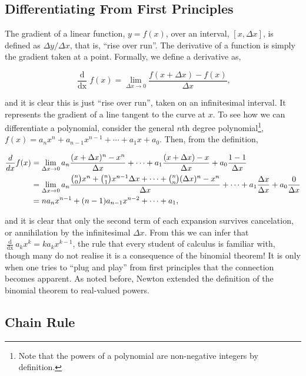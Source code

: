 \documentclass[11pt]{amsart}
\begin{document}
\subsection{Differentiating From First Principles}

The gradient of a linear function, $y = f(x)$, over an interval, $[x, \Delta x]$, is defined as $\Delta y / \Delta x$, that is, ``rise over run''. The derivative of a function is simply the gradient taken at a point. Formally, we define a derivative as,

$$\frac{\mathop{d}}{\mathop{dx}} f(x) = \lim_{\Delta x \to 0} \frac{f(x  + \Delta x) - f(x)}{\Delta x},$$

and it is clear this is just ``rise over run'', taken on an infinitesimal interval. It represents the gradient of a line tangent to the curve at $x$. To see how we can differentiate a polynomial, consider the general $n$th degree polynomial\footnote{Note that the powers of a polynomial are non-negative integers by definition.}, $f(x) = a_nx^n + a_{n-1}x^{n-1} + \cdots + a_1x + a_0$. Then, from the definition,

\begin{align}
\frac{\mathop{d}}{\mathop{dx}} f(x) &= \lim_{\Delta x \to 0} a_n\frac{(x + \Delta x)^n - x^n}{\Delta x} + \cdots + a_1\frac{(x + \Delta x) - x}{\Delta x} + a_0\frac{1 - 1}{\Delta x}\notag \\
&= \lim_{\Delta x \to 0} a_n\frac{{{n}\choose{0}}x^n + {{n}\choose{1}}x^{n-1}\Delta x + \cdots + {{n}\choose{n}}(\Delta x)^n - x^n}{\Delta x} + \cdots + a_1\frac{\Delta x}{\Delta x} + a_0\frac{0}{\Delta x} \notag \\
&= na_nx^{n-1} + (n-1)a_{n-1}x^{n-2} + \cdots + a_1, \notag
\end{align}

and it is clear that only the second term of each expansion survives cancelation, or annihilation by the infinitesimal $\Delta x$. From this we can infer that $\frac{\mathop{d}}{\mathop{dx}} a_kx^k = ka_kx^{k-1}$, the rule that every student of calculus is familiar with, though many do not realise it is a consequence of the binomial theorem! It is only when one tries to ``plug and play'' from first principles that the connection becomes apparent. As noted before, Newton extended the definition of the binomial theorem to real-valued powers.

\subsection{Chain Rule}
\end{document}
